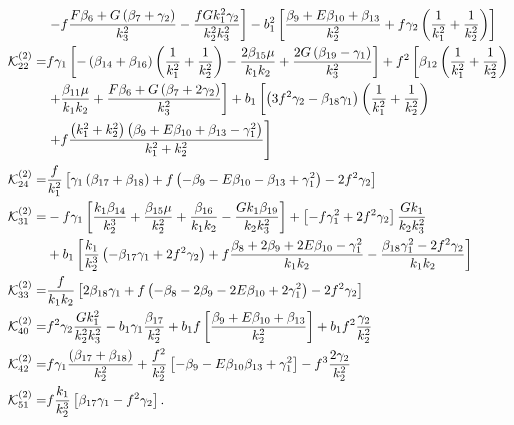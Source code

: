 \begin{align*}
&\left. - f\frac{F \beta_{6} + G \left(\beta_{7} + \gamma_2 \right)}{k_3^2} - \frac{f G k_1^2 \gamma_2}{k_2^2 k_3^2}\right] - b_1^2 \left[ \frac{\beta_{9} + E \beta_{10} + \beta_{13}}{k_2^2}  + f \gamma_2 \left(\frac{1}{k_1^2}+\frac{1}{k_2^2} \right)\right] \\
\mathcal{K}_{22}^{(2)}=&  f \gamma_1 \left[ - \left(\beta_{14} + \beta_{16} \right)\left(\frac{1}{k_1^2}+\frac{1}{k_2^2}\right)  - \frac{2 \beta_{15} \mu}{k_1 k_2} + \frac{2 G \left(\beta_{19} - \gamma_1\right)}{k_3^2}\right] + f^2 \left[ \beta_{12}\left(\frac{1}{k_1^2}+\frac{1}{k_2^2} \right) \right. \\
&\left. + \frac{\beta_{11} \mu}{k_1 k_2} + \frac{F \beta_{6} + G \left(\beta_{7} + 2 \gamma_2\right)}{k_3^2}  \right] + b_1 \left[  \left(3 f^2 \gamma_2 -\beta_{18} \gamma_1 \right) \left(\frac{1}{k_1^2}+\frac{1}{k_2^2} \right) \right. \\
&\left. + f \frac{\left(k_1^2 + k_2^2\right) \left(\beta_{9} + E \beta_{10} + \beta_{13} - \gamma_1^2\right)}{k_1^2 + k_2^2}   \right]\\
\mathcal{K}_{24}^{(2)}=& \frac{f}{k_1^2} \left[ \gamma_1 \left(\beta_{17} + \beta_{18}\right)+ f\left(- \beta_{9} - E \beta_{10} - \beta_{13} + \gamma_1^2\right) - 2 f^2 \gamma_2 \right]\\
\mathcal{K}_{31}^{(2)}=& - f \gamma_1 \left[ \frac{k_1 \beta_{14}}{k_2^3} + \frac{\beta_{15} \mu}{k_2^2} + \frac{\beta_{16}}{k_1 k_2} - \frac{G k_1 \beta_{19}}{k_2 k_3^2} \right] + \left[- f \gamma_1^2 + 2 f^2 \gamma_2 \right] \frac{G k_1}{k_2 k_3^2} \\
&+ b_1 \left[  \frac{k_1}{k_2^3} \left( -\beta_{17} \gamma_1 + 2 f^2 \gamma_2 \right) + f \frac{\beta_{8}  + 2 \beta_{9} + 2 E \beta_{10} - \gamma_1^2 }{k_1 k_2}  - \frac{\beta_{18} \gamma_1^2 - 2 f^2 \gamma_2}{k_1 k_2} \right] \\
\mathcal{K}_{33}^{(2)}=&\frac{f}{k_1 k_2} \left[ 2 \beta_{18} \gamma_1 + f \left( - \beta_{8} - 2 \beta_{9} - 2 E \beta_{10} + 2 \gamma_1^2 \right) - 2 f^2 \gamma_2 \right]\\
\mathcal{K}_{40}^{(2)}=& f^2 \gamma_2 \frac{G k_1^2}{k_2^2 k_3^2} - b_1 \gamma_1 \frac{\beta_{17}}{k_2^2} + b_1 f \left[ \frac{\beta_{9} + E \beta_{10} + \beta_{13}}{k_2^2} \right] + b_1 f^2 \frac{\gamma_2}{k_2^2} \\
\mathcal{K}_{42}^{(2)}=& f \gamma_1 \frac{\left( \beta_{17} + \beta_{18}\right)}{k_2^2} + \frac{f^2}{k_2^2} \left[ -\beta_{9} - E \beta_{10} \beta_{13} + \gamma_1^2 \right] - f^3 \frac{2 \gamma_2}{k_2^2}\\
\mathcal{K}_{51}^{(2)}=& f \frac{k_1}{k_2^3} \left[ \beta_{17} \gamma_1 - f^2 \gamma_2  \right]  .
\end{align*}

